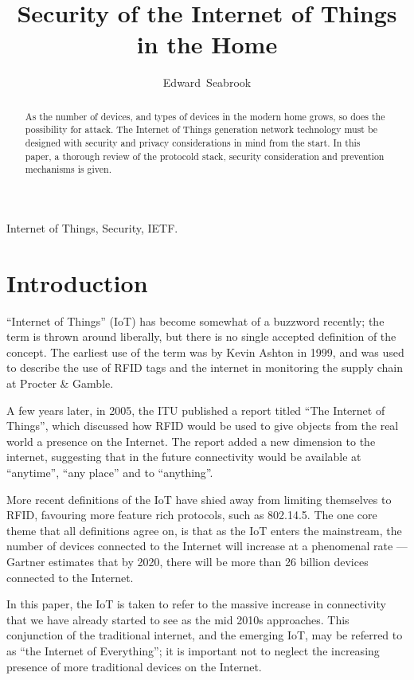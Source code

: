 \documentclass[11pt,journal,compsoc]{IEEEtran}
\begin{document}
\title{Security of the Internet of Things in the Home}
\author{Edward~Seabrook }

\maketitle


\begin{abstract}
As the number of devices, and types of devices in the modern home grows, so
does the possibility for attack. The Internet of Things generation network
technology must be designed with security and privacy considerations in mind
from the start. In this paper, a thorough review of the protocold stack,
security consideration and prevention mechanisms is given. 
\end{abstract}

\begin{IEEEkeywords}
Internet of Things, Security, IETF.
\end{IEEEkeywords}

\IEEEpeerreviewmaketitle

\section{Introduction}
 ``Internet of Things'' (IoT) has become somewhat of a
buzzword recently; the term is thrown around liberally, but there is no single
accepted definition of the concept. The earliest use of the term was by Kevin
Ashton in 1999, and was used to describe the use of RFID tags and the internet
in monitoring the supply chain at Procter \& Gamble. 

A few years later, in 2005, the ITU published a report titled “The Internet of
Things”, which discussed how RFID would be used to give objects from the real
world a presence on the Internet. The report added a new dimension to the
internet, suggesting that in the future connectivity would be available at
``anytime'', ``any place'' and to ``anything''.

More recent definitions of the IoT have shied away from limiting themselves to
RFID, favouring more feature rich protocols, such as 802.14.5. The one core
theme that all definitions agree on, is that as the IoT enters the mainstream,
the number of devices connected to the Internet will increase at a phenomenal
rate — Gartner estimates that by 2020, there will be more than 26 billion
devices connected to the Internet. 

In this paper, the IoT is taken to refer to the massive increase in
connectivity that we have already started to see as the mid 2010s approaches.
This conjunction of the traditional internet, and the emerging IoT, may be
referred to as ``the Internet of Everything''; it is important not to neglect
the increasing presence of more traditional devices on the Internet. 
\end{document}
